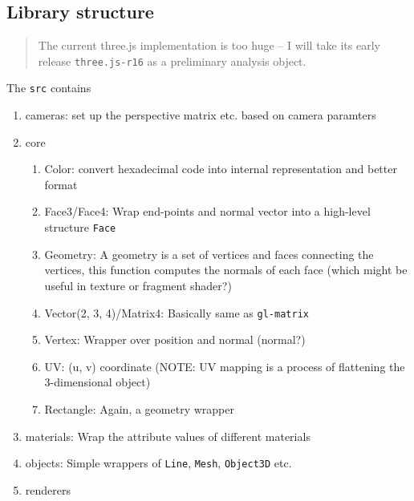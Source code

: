 \subsection{Library structure}\label{library-structure}

\begin{quote}
The current three.js implementation is too huge -- I will take its early
release \texttt{three.js-r16} as a preliminary analysis object.
\end{quote}

The \texttt{src} contains

\begin{enumerate}
\def\labelenumi{\arabic{enumi}.}
\tightlist
\item
  cameras: set up the perspective matrix etc. based on camera paramters
\item
  core

  \begin{enumerate}
  \def\labelenumii{\arabic{enumii}.}
  \tightlist
  \item
    Color: convert hexadecimal code into internal representation and
    better format
  \item
    Face3/Face4: Wrap end-points and normal vector into a high-level
    structure \texttt{Face}
  \item
    Geometry: A geometry is a set of vertices and faces connecting the
    vertices, this function computes the normals of each face (which
    might be useful in texture or fragment shader?)
  \item
    Vector(2, 3, 4)/Matrix4: Basically same as \texttt{gl-matrix}
  \item
    Vertex: Wrapper over position and normal (normal?)
  \item
    UV: (u, v) coordinate (NOTE: UV mapping is a process of flattening
    the 3-dimensional object)
  \item
    Rectangle: Again, a geometry wrapper
  \end{enumerate}
\item
  materials: Wrap the attribute values of different materials
\item
  objects: Simple wrappers of \texttt{Line}, \texttt{Mesh},
  \texttt{Object3D} etc.
\item
  renderers


\end{enumerate}
